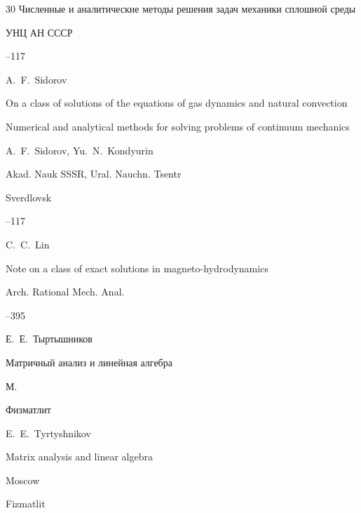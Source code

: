 {\begin{thebibliography}{30}
\inbook Численные и аналитические методы решения задач механики сплошной среды

\publ УНЦ АН СССР


--117

\misctransl

\by A.~F.~Sidorov

\paper On a class of solutions of the equations of gas dynamics and natural convection

\inbook Numerical and analytical methods for solving problems of continuum mechanics

\ed A.~F.~Sidorov, Yu.~N.~Kondyurin

\publ Akad. Nauk SSSR, Ural. Nauchn. Tsentr

\publaddr Sverdlovsk


--117




\by C.~C.~Lin

\paper Note on a class of exact solutions in magneto-hydrodynamics

\jour Arch. Rational Mech. Anal.




--395








\by Е.~Е.~Тыртышников

\book Матричный анализ и линейная алгебра

\publaddr М.

\publ Физматлит



\misctransl

\by E.~E.~Tyrtyshnikov 

\book Matrix analysis and linear algebra

\publaddr Moscow

\publ Fizmatlit







\end{thebibliography}}
